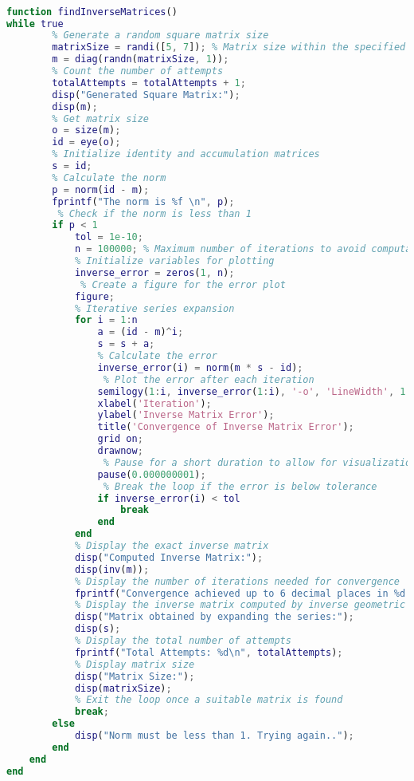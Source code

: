 \begin{sourcecode}
\label{sourcecode-matrix-inverse}   

\begin{lstlisting}[language=MATLAB]

function findInverseMatrices()
while true
        % Generate a random square matrix size
        matrixSize = randi([5, 7]); % Matrix size within the specified range
        m = diag(randn(matrixSize, 1));
        % Count the number of attempts
        totalAttempts = totalAttempts + 1;
        disp("Generated Square Matrix:");
        disp(m);
        % Get matrix size
        o = size(m);
        id = eye(o);
        % Initialize identity and accumulation matrices
        s = id;
        % Calculate the norm
        p = norm(id - m);
        fprintf("The norm is %f \n", p);
         % Check if the norm is less than 1
        if p < 1
            tol = 1e-10;
            n = 100000; % Maximum number of iterations to avoid computational complexity
            % Initialize variables for plotting
            inverse_error = zeros(1, n);
             % Create a figure for the error plot
            figure;
            % Iterative series expansion
            for i = 1:n
                a = (id - m)^i;
                s = s + a;
                % Calculate the error
                inverse_error(i) = norm(m * s - id);
                 % Plot the error after each iteration
                semilogy(1:i, inverse_error(1:i), '-o', 'LineWidth', 1.5);
                xlabel('Iteration');
                ylabel('Inverse Matrix Error');
                title('Convergence of Inverse Matrix Error');
                grid on;
                drawnow;
                 % Pause for a short duration to allow for visualization
                pause(0.000000001);
                 % Break the loop if the error is below tolerance
                if inverse_error(i) < tol
                    break
                end
            end
            % Display the exact inverse matrix
            disp("Computed Inverse Matrix:");
            disp(inv(m));
            % Display the number of iterations needed for convergence
            fprintf("Convergence achieved up to 6 decimal places in %d iterations.\n", i);
            % Display the inverse matrix computed by inverse geometric series
            disp("Matrix obtained by expanding the series:");
            disp(s);
            % Display the total number of attempts
            fprintf("Total Attempts: %d\n", totalAttempts);
            % Display matrix size
            disp("Matrix Size:");
            disp(matrixSize);
            % Exit the loop once a suitable matrix is found
            break;
        else
            disp("Norm must be less than 1. Trying again..");
        end
    end
end
    \end{lstlisting}  
\end{sourcecode}

